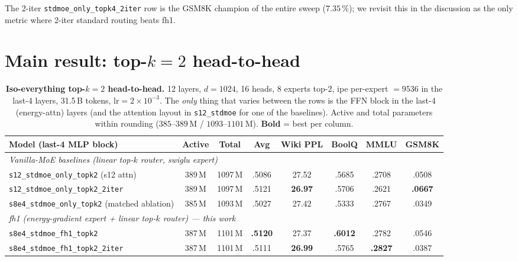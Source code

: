 \documentclass[oneside]{article}
\begin{document}
The 2-iter \texttt{stdmoe\_only\_topk4\_2iter} row is the GSM8K
champion of the entire sweep ($7.35\,\%$); we revisit this in the
discussion as the only metric where 2-iter standard routing beats fh1.


\section{Main result: top-$k=2$ head-to-head}
\label{sec:topk2}

\begin{table}[t]
\centering
\caption{\textbf{Iso-everything top-$k=2$ head-to-head.}
12 layers, $d=1024$, 16 heads, 8 experts top-2, ipe per-expert $=9536$
in the last-4 layers, 31.5\,B tokens, lr$=2{\times}10^{-3}$. The
\emph{only} thing that varies between the rows is the FFN block in
the last-4 (energy-attn) layers (and the attention layout in
\texttt{s12\_stdmoe} for one of the baselines). Active and total
parameters within rounding ($385$--$389\,$M / $1093$--$1101\,$M).
\textbf{Bold} = best per column.}
\label{tab:main}
\begin{adjustbox}{max width=\textwidth}
\begin{tabular}{l|cc|c|c|c|c|c}
\toprule
\textbf{Model (last-4 MLP block)} & \textbf{Active} & \textbf{Total} & \textbf{Avg} & \textbf{Wiki PPL} & \textbf{BoolQ} & \textbf{MMLU} & \textbf{GSM8K} \\
\midrule
\multicolumn{8}{l}{\emph{Vanilla-MoE baselines (linear top-$k$ router, swiglu expert)}} \\
\texttt{s12\_stdmoe\_only\_topk2} (s12 attn) & 389\,M & 1097\,M & .5086 & 27.52 & .5685 & .2708 & .0508 \\
\texttt{s12\_stdmoe\_only\_topk2\_2iter}     & 389\,M & 1097\,M & .5121 & \textbf{26.97} & .5706 & .2621 & \textbf{.0667} \\
\texttt{s8e4\_stdmoe\_only\_topk2} (matched ablation) & 385\,M & 1093\,M & .5027 & 27.42 & .5333 & .2767 & .0349 \\
\midrule
\multicolumn{8}{l}{\emph{fh1 (energy-gradient expert + linear top-$k$ router) --- this work}} \\
\rowcolor{green!15}
\texttt{s8e4\_stdmoe\_fh1\_topk2}            & 387\,M & 1101\,M & \textbf{.5120} & 27.37 & \textbf{.6012} & .2782 & .0546 \\
\texttt{s8e4\_stdmoe\_fh1\_topk2\_2iter}     & 387\,M & 1101\,M & .5111 & \textbf{26.99} & .5765 & \textbf{.2827} & .0387 \\
\bottomrule
\end{tabular}
\end{adjustbox}
\end{table}
\end{document}

